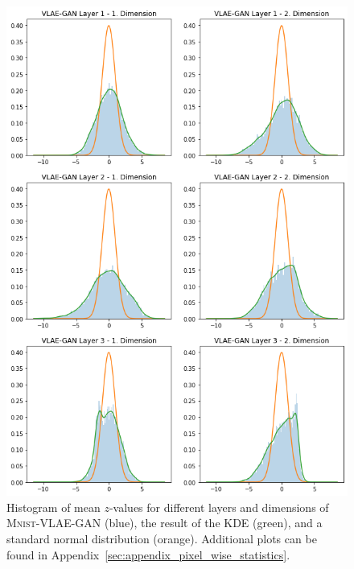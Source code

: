 \begin{figure}
    \centering
    \includegraphics[width=.8\textwidth]{images/generated_vs_true/mnist/vlae_gan_kde.png}
    \caption[\textsc{Mnist}-VLAE-GAN - Latent Space Distribution]{Histogram of mean $z$-values for different layers and dimensions of \textsc{Mnist}-VLAE-GAN (blue), the result of the KDE (green), and a standard normal distribution (orange). Additional plots can be found in Appendix~\ref{sec:appendix_pixel_wise_statistics}.}
    \label{fig:vlae_gan_kde}
\end{figure}


